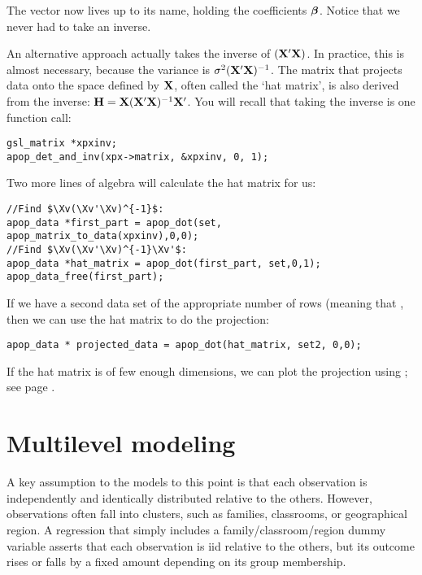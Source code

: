 The vector  now lives up to its name, holding the coefficients
${\mbox{\boldmath$\beta$}}$. Notice that we never had to take an inverse.  

An alternative approach actually takes the inverse of $({\bf X}'{\bf X})$. In practice, this is
almost necessary, because the variance is $\sigma^2 ({\bf X}'{\bf X})^{-1}$.
The matrix that projects data onto the space defined by ${\bf X}$,
often called the `hat matrix', is also derived from the inverse: ${\bf H} = {\bf X}({\bf X}'{\bf X})^{-1}{\bf X}'$. You will recall that taking the inverse is one function call:
\begin{lstlisting}
gsl_matrix *xpxinv;
apop_det_and_inv(xpx->matrix, &xpxinv, 0, 1);
\end{lstlisting}
Two more lines of algebra will calculate the hat matrix for us: 
\lstset{texcl=true}
\begin{lstlisting}
//Find $\Xv(\Xv'\Xv)^{-1}$:
apop_data *first_part = apop_dot(set, apop_matrix_to_data(xpxinv),0,0);
//Find $\Xv(\Xv'\Xv)^{-1}\Xv'$:
apop_data *hat_matrix = apop_dot(first_part, set,0,1);
apop_data_free(first_part);
\end{lstlisting}
\lstset{texcl=false} %

If we have a second data set  of the appropriate number of
rows (meaning that , then we can use the hat matrix to do the projection:\\
\begin{lstlisting}
apop_data * projected_data = apop_dot(hat_matrix, set2, 0,0);
\end{lstlisting}
If the hat matrix is of few enough dimensions, we can plot the
projection using ; see page \pageref{gnuprint}.


\section{Multilevel modeling} A key assumption to the models to this
point is that each observation is independently and identically distributed
relative to the others. However, observations often fall into clusters,
such as families, classrooms, or geographical region. 
A regression that simply includes a family/classroom/region dummy variable
asserts that each observation is iid relative to the others, but its
outcome rises or falls by a fixed amount depending on its group
membership.

